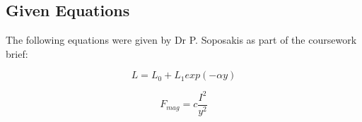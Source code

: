 \subsection*{Given Equations} The following equations were given by Dr P. Soposakis as part of the coursework brief:

\begin{equation} \label{eq:1}
    L = L_0 + L_1 exp(-\alpha y)
\end{equation}

\begin{equation} \label{eq:2}
    F_{mag}=c \frac{I^2}{y^2}
\end{equation}

